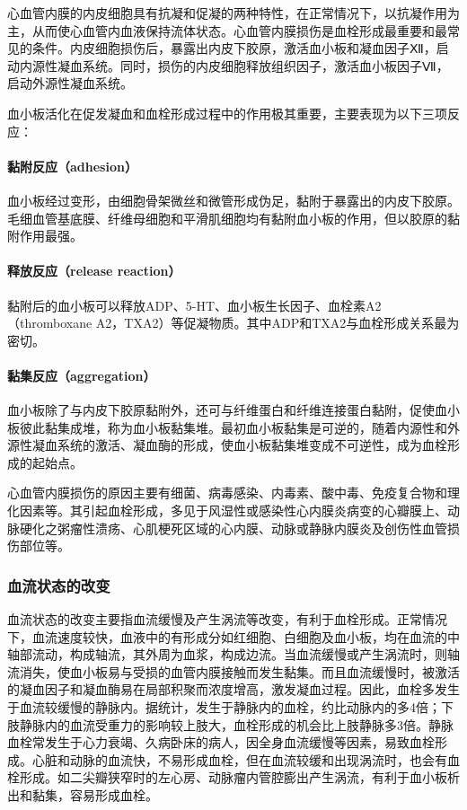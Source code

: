 心血管内膜的内皮细胞具有抗凝和促凝的两种特性，在正常情况下，以抗凝作用为主，从而使心血管内血液保持流体状态。心血管内膜损伤是血栓形成最重要和最常见的条件。内皮细胞损伤后，暴露出内皮下胶原，激活血小板和凝血因子Ⅻ，启动内源性凝血系统。同时，损伤的内皮细胞释放组织因子，激活血小板因子Ⅶ，启动外源性凝血系统。

血小板活化在促发凝血和血栓形成过程中的作用极其重要，主要表现为以下三项反应：

\paragraph{黏附反应（adhesion）}
血小板经过变形，由细胞骨架微丝和微管形成伪足，黏附于暴露出的内皮下胶原。毛细血管基底膜、纤维母细胞和平滑肌细胞均有黏附血小板的作用，但以胶原的黏附作用最强。

\paragraph{释放反应（release reaction）}
黏附后的血小板可以释放ADP、5-HT、血小板生长因子、血栓素A2（thromboxane
A2，TXA2）等促凝物质。其中ADP和TXA2与血栓形成关系最为密切。

\paragraph{黏集反应（aggregation）}
血小板除了与内皮下胶原黏附外，还可与纤维蛋白和纤维连接蛋白黏附，促使血小板彼此黏集成堆，称为血小板黏集堆。最初血小板黏集是可逆的，随着内源性和外源性凝血系统的激活、凝血酶的形成，使血小板黏集堆变成不可逆性，成为血栓形成的起始点。

心血管内膜损伤的原因主要有细菌、病毒感染、内毒素、酸中毒、免疫复合物和理化因素等。其引起血栓形成，多见于风湿性或感染性心内膜炎病变的心瓣膜上、动脉硬化之粥瘤性溃疡、心肌梗死区域的心内膜、动脉或静脉内膜炎及创伤性血管损伤部位等。

\subsubsection{血流状态的改变}

血流状态的改变主要指血流缓慢及产生涡流等改变，有利于血栓形成。正常情况下，血流速度较快，血液中的有形成分如红细胞、白细胞及血小板，均在血流的中轴部流动，构成轴流，其外周为血浆，构成边流。当血流缓慢或产生涡流时，则轴流消失，使血小板易与受损的血管内膜接触而发生黏集。而且血流缓慢时，被激活的凝血因子和凝血酶易在局部积聚而浓度增高，激发凝血过程。因此，血栓多发生于血流较缓慢的静脉内。据统计，发生于静脉内的血栓，约比动脉内的多4倍；下肢静脉内的血流受重力的影响较上肢大，血栓形成的机会比上肢静脉多3倍。静脉血栓常发生于心力衰竭、久病卧床的病人，因全身血流缓慢等因素，易致血栓形成。心脏和动脉的血流快，不易形成血栓，但在血流较缓和出现涡流时，也会有血栓形成。如二尖瓣狭窄时的左心房、动脉瘤内管腔膨出产生涡流，有利于血小板析出和黏集，容易形成血栓。

